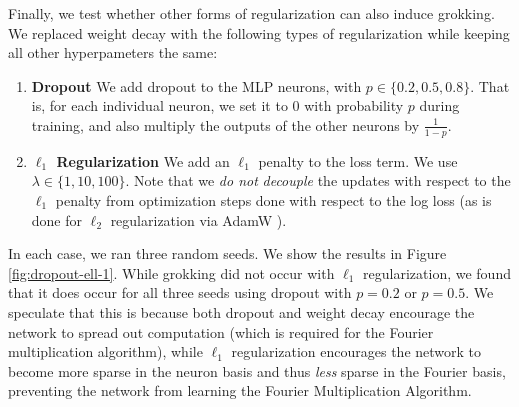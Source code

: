 \documentclass{article} %
\begin{document}
Finally, we test whether other forms of regularization can also induce grokking. We replaced weight decay with the following types of regularization while keeping all other hyperpameters the same:
\begin{enumerate}
    \item \textbf{Dropout} We add dropout \cite{srivastava2014dropout} to the MLP neurons, with $p \in \{0.2, 0.5, 0.8\}$. That is, for each individual neuron, we set it to $0$ with probability $p$ during training, and also multiply the outputs of the other neurons by $\frac{1}{1-p}$.
    \item \textbf{$\ell_1$ Regularization} We add an $\ell_1$ penalty to the loss term. We use $\lambda \in  \{1, 10, 100\}$. Note that we \textit{do not} \textit{decouple} the updates with respect to the $\ell_1$ penalty from optimization steps done with respect to the log loss (as is done for $\ell_2$ regularization via AdamW \cite{loshchilov2017decoupled}). 
\end{enumerate}

In each case, we ran three random seeds. We show the results in Figure \ref{fig:dropout-ell-1}. While grokking did not occur with $\ell_1$ regularization, we found that it does occur for all three seeds using dropout with $p=0.2$ or $p=0.5$. We speculate that this is because both dropout and weight decay encourage the network to spread out computation (which is required for the Fourier multiplication algorithm), while $\ell_1$ regularization encourages the network to become more sparse in the neuron basis and thus \emph{less} sparse in the Fourier basis, preventing the network from learning the Fourier Multiplication Algorithm. 
\end{document}
